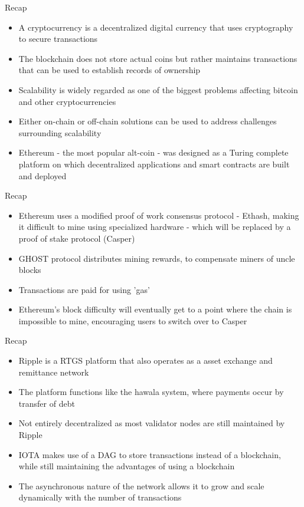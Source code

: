 \documentclass[9pt]{beamer}
\begin{document}
\begin{frame}{Recap}
	\begin{itemize}
		\item A cryptocurrency is a decentralized digital currency that uses cryptography to secure transactions
		\item The blockchain does not store actual coins but rather maintains transactions that can be used to establish records of ownership
		\item Scalability is widely regarded as one of the biggest problems affecting bitcoin and other cryptocurrencies
		\item Either on-chain or off-chain solutions can be used to address challenges surrounding scalability
		\item Ethereum - the most popular alt-coin - was designed as a Turing complete platform on which decentralized applications and smart contracts are built and deployed
	\end{itemize}
\end{frame}


\begin{frame}{Recap}
	\begin{itemize}
		\item Ethereum uses a modified proof of work consensus protocol - Ethash, making it difficult to mine using specialized hardware - which will be replaced by a proof of stake protocol (Casper)
		\item GHOST protocol distributes mining rewards, to compensate miners of uncle blocks
		\item Transactions are paid for using 'gas'
		\item Ethereum's block difficulty will eventually get to a point where the chain is impossible to mine, encouraging users to switch over to Casper
	\end{itemize}
\end{frame}


\begin{frame}{Recap}
	\begin{itemize}
		\item Ripple is a RTGS platform that also operates as a asset exchange and remittance network
		\item The platform functions like the hawala system, where payments occur by transfer of debt
		\item Not entirely decentralized as most validator nodes are still maintained by Ripple
		\item IOTA makes use of a DAG to store transactions instead of a blockchain, while still maintaining the advantages of using a blockchain
		\item The asynchronous nature of the network allows it to grow and scale dynamically with the number of transactions
	\end{itemize}
\end{frame}
\end{document}
